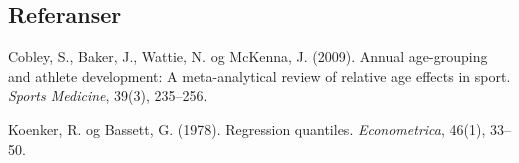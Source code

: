 \subsection{Referanser}\label{referanser}

\begin{referanser}

Cobley, S., Baker, J., Wattie, N. og McKenna, J. (2009). Annual age-grouping and athlete development: A meta-analytical review of relative age effects in sport. \emph{Sports Medicine}, 39(3), 235--256.

Koenker, R. og Bassett, G. (1978). Regression quantiles. \emph{Econometrica}, 46(1), 33--50.

\end{referanser}
